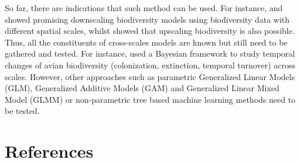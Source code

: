 \documentclass[
  12pt,
  oneside]{report}
\begin{document}
So far, there are indications that such method can be used. For instance, \textcite{keil_downscaling_2014} and \textcite{keil_downscaling_2013} showed promising downscaling biodiversity models using biodiversity data with different
spatial scales, whilst \textcite{kunin_upscaling_2018} showed that upscaling biodiversity is also possible. Thus, all
the constituents of cross-scales models are known but still need to be gathered and tested. For
instance, \textcite{jarzyna_spatial_2015} used a Bayesian framework to study temporal changes of avian
biodiversity (colonization, extinction, temporal turnover) across scales. However, other approaches
such as parametric Generalized Linear Models (GLM), Generalized Additive Models (GAM) and
Generalized Linear Mixed Model (GLMM) or non-parametric tree based machine learning methods
need to be tested.


\singlespacing %
\chapter{References}\label{references}
{
\renewcommand{\clearpage}{}
\printbibliography[heading=none] %
}
\end{document}

